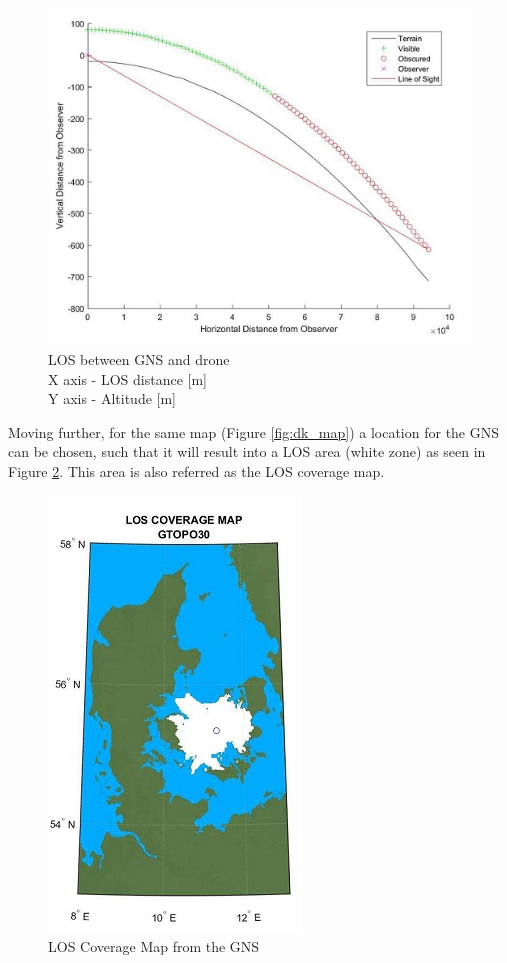 \begin{figure}[h]
	\centering
	\includegraphics[scale=2.5]{figures/los_2points.jpg}
	\caption{LOS between GNS and drone \\ X axis - LOS distance [m] \\ Y axis - Altitude [m]}
   	\label{fig:los_2p}
\end{figure}

Moving further, for the same map (Figure \ref{fig:dk_map}) a location for the GNS can be chosen, such that it will result into a LOS area (white zone) as seen in Figure \ref{fig:los_area}. This area is also referred as the LOS coverage map.

\begin{figure}[h]
	\centering
	\includegraphics[scale=2.5]{figures/coverage_map.jpg}
	\caption{LOS Coverage Map from the GNS}
   	\label{fig:los_area}
\end{figure}

